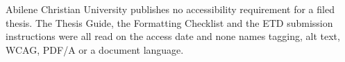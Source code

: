 
%

%
	{Abilene Christian University publishes no accessibility requirement for a
	 filed thesis. The Thesis Guide, the Formatting Checklist and the ETD
	 submission instructions were all read on the access date and none names
	 tagging, alt text, WCAG, PDF/A or a document language.}

